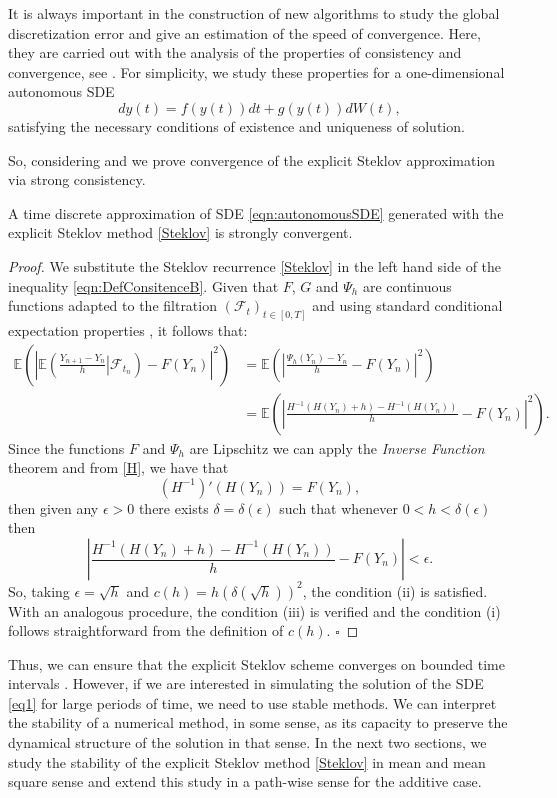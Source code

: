 
		It is always important in the construction of  new algorithms to study  the global
	discretization error and give an estimation of the speed of convergence. Here, they are
	carried out with  the analysis of the properties of consistency and convergence, see
	\cite{Kloeden1992}. For simplicity, we study these properties for a
	one-dimensional autonomous SDE
	\begin{equation}\label{eqn:autonomousSDE}
		dy(t) = f(y(t))dt+g(y(t))dW(t),
	\end{equation}
	satisfying the necessary conditions of existence and uniqueness of solution. 

	So, considering  and  we prove 
	convergence of the explicit Steklov approximation via strong consistency. 
	\begin{thm}\label{thm:Consistency}
		A time discrete approximation of SDE 
	\eqref{eqn:autonomousSDE} generated with the explicit Steklov method 
	\eqref{Steklov} is strongly convergent.
	\end{thm}
	\begin{proof}
		We substitute the Steklov recurrence \eqref{Steklov} in the left hand side of the
	inequality \eqref{eqn:DefConsitenceB}. Given that $F$, $G$ and $\Psi_h$ are continuous
	functions adapted to the filtration $(\mathcal{F}_t)_{t\in[0,T]}$ and using standard
	conditional expectation properties \cite{Williams1991}, it follows that:
	\begin{align*}
		\mathbb{E} \left(	\left| \mathbb{E} \left( \frac{Y_{n+1}-Y_n}{h}
		\left|\mathcal{F}_{t_n}\right.\right)-F \left(Y_n\right)\right|^2\right)
		&= \mathbb{E} \left(\left|\frac{\Psi_h(Y_n)-Y_n}{h}-F(Y_n)\right|^2
		\right)\\
		&= \mathbb{E} \left(\left|\frac{H^{-1}(H(Y_n)+h)-H^{-1}(H(Y_n))}{h}
		-F(Y_n)\right|^2\right).
	\end{align*}
	Since the functions $F$ and $\Psi_h$ are Lipschitz we can apply the {\it Inverse
	Function} theorem and from  \eqref{H}, we have that
	$$
		(H^{-1})'(H(Y_n))=F(Y_n),
	$$
	then given any $\epsilon>0$  there exists $\delta=\delta(\epsilon)$ such that whenever
	$0<h<\delta(\epsilon)$ then
	$$
		\left|
		\frac{H^{-1}(H(Y_n)+h)-H^{-1}(H(Y_n))}{h}
		-F(Y_n)
		\right|<\epsilon.
	$$
	So, taking $\epsilon=\sqrt{h}$ and $c(h)=h(\delta(\sqrt{h}))^2$, the  condition (ii)
	is satisfied. With an analogous procedure, the condition (iii) is verified and the
	condition (i) follows straightforward from the definition of $c(h)$. \quad $\square$
	\end{proof}
	
		Thus,  we can ensure that the explicit Steklov scheme converges on bounded time
	intervals \cite{Robinson2002}. However, if we are interested in simulating the
	solution of the SDE \eqref{eq1} for large periods of time, we need to use stable
	methods. We can interpret the stability of a numerical method, in some sense, as its
	capacity to preserve the  dynamical structure of the solution in that sense.  In the
	next two sections, we study the stability of the explicit Steklov method
	\eqref{Steklov} in mean and mean square sense and extend this study in a path-wise
	sense for the additive case.